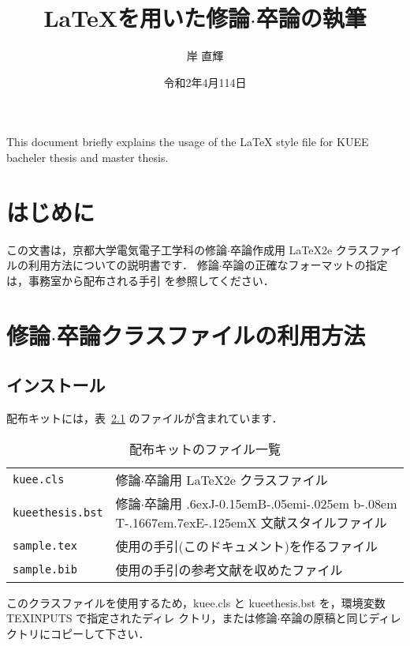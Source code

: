 \documentclass[sotsuron]{kuee}
\title{\LaTeX を用いた修論$\cdot$卒論の執筆}
\author{岸 直輝}
\date{令和2年4月114日}
\def\BibTeX{{\rm B\kern-.05em{\sc i\kern-.025em b}\kern-.08em
    T\kern-.1667em\lower.7ex\hbox{E}\kern-.125emX}}
\def\JBibTeX{\leavevmode\lower .6ex\hbox{J}\kern-0.15em\BibTeX}
\begin{document}
\maketitle			%
\begin{eabstract}		%
This document briefly explains the usage of the \LaTeX{} style file
for KUEE bacheler thesis and master thesis.
\end{eabstract}
\tableofcontents		%

\chapter{はじめに}
\label{chap:intro}

この文書は，京都大学電気電子工学科の修論$\cdot$卒論作成用 \LaTeX2e{}
クラスファイルの利用方法についての説明書です．
%
修論$\cdot$卒論の正確なフォーマットの指定は，事務室から配布される手引
を参照してください．


\chapter{修論$\cdot$卒論クラスファイルの利用方法}
\label{chap:usage}

\section{インストール}

配布キットには，表~\ref{tab:kit} のファイルが含まれています．
\begin{table}
  \caption{配布キットのファイル一覧}\label{tab:kit}
  \begin{center}
    \begin{tabular}{ll}
      \verb+kuee.cls+ & 修論$\cdot$卒論用 \LaTeX2e{} クラスファイル \\
      \verb+kueethesis.bst+ & 修論$\cdot$卒論用 \JBibTeX{} 文献スタイルファイル \\
      \verb+sample.tex+ & 使用の手引(このドキュメント)を作るファイル \\
      \verb+sample.bib+ & 使用の手引の参考文献を収めたファイル \\
    \end{tabular}
  \end{center}
\end{table}

このクラスファイルを使用するため，{\ttfamily kuee.cls} と {\ttfamily
kueethesis.bst} を，環境変数 {\ttfamily TEXINPUTS} で指定されたディレ
クトリ，または修論$\cdot$卒論の原稿と同じディレクトリにコピーして下さい．
\end{document}
